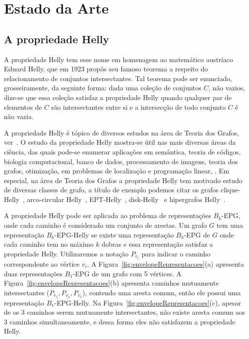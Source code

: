 \section{Estado da Arte}

\subsection{A propriedade Helly}

A propriedade Helly tem esse nome em homenagem ao matemático austríaco Eduard Helly, que em 1923 propôs seu famoso teorema a respeito do relacionamento de conjuntos intersectantes. Tal teorema pode ser enunciado, grosseiramente, da seguinte forma: dada uma coleção de conjuntos $C$, não vazios, dize-se que essa coleção satisfaz a propriedade Helly quando qualquer par de elementos de $C$ são intersectantes entre si e a intersecção de todo conjunto $C$ é não vazia.

A propriedade Helly é tópico de diversos estudos na área de Teoria dos Grafos, ver~\cite{berge1973,bergeDuchet1975,golumbic2013, teles2016,jose2018}.
O estudo da propriedade Helly mostra-se útil nas mais diversas áreas da ciência, das quais  pode-se enumerar aplicações em  semântica, teoria de códigos, biologia computacional, banco de dados, processamento de imagens, teoria dos grafos, otimização, em problemas de localização e programação linear, \cite{teles2016}. Em especial, na área de Teoria dos Grafos a propriedade Helly tem motivado estudo de  diversas classes de grafo, a título de exemplo podemos citar os grafos clique-Helly~\cite{DOURADO2008}, arco-circular Helly~\cite{safe2016essential}, EPT-Helly~\cite{alcon2017helly}, disk-Helly~\cite{lin2007faster} e hipergrafos Helly~\cite{mulder1979median}.

A propriedade Helly pode ser aplicada ao problema de representações $ B_k$-EPG, onde cada caminho é considerado um conjunto de arestas. Um grafo $ G $ tem uma representação $ B_k$-EPG-Helly se existe uma representação $ B_k $-EPG de $G$ onde cada caminho tem no máximo $ k $ dobras e essa representação satisfaz a propriedade Helly. 
Utilizaremos a notação $P_{v_i}$ para indicar o caminho correspondente ao vértice $v_i$.
A Figura~\ref{fig:envelopeRepresentacoes}(a) apresenta duas representações  $B_1$-EPG  de um grafo com 5 vértices. A Figura~\ref{fig:envelopeRepresentacoes}(b)   apresenta caminhos mutuamente intersectantes ($P_{v_1}, P_{v_2}, P_{v_5}$), contendo uma aresta comum, então ele possui uma representação $ B_1$-EPG-Helly. Na Figura~\ref{fig:envelopeRepresentacoes}(c), apesar de os 3 caminhos serem mutuamente intersectantes, não existe aresta comum aos 3 caminhos simultaneamente, e dessa forma eles não satisfazem a propriedade Helly.


